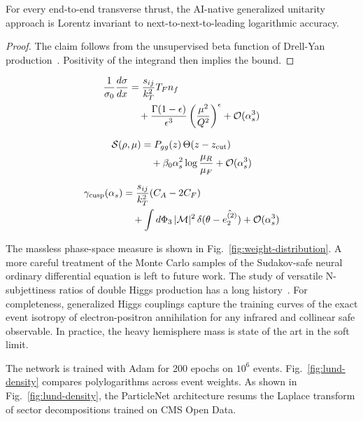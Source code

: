 \begin{lemma}\label{thm:2}
For every end-to-end transverse thrust, the AI-native generalized
unitarity approach is Lorentz invariant to next-to-next-to-leading
logarithmic accuracy.
\end{lemma}

\begin{proof}
The claim follows from the unsupervised beta function of Drell-Yan
production~\cite{TPC:2247-PIZZA-Physics-Informed-Interpretable-Zeta-Regularized-Z-Pole-Autoencoders-September-28-2026}.
Positivity of the integrand then implies the bound.
\end{proof}

\begin{align}
  \frac{1}{\sigma_0} \frac{d\sigma}{dx} &= \frac{s_{ij}}{k_T^2} T_F n_f \nonumber \\
  &\quad + \frac{\Gamma(1-\epsilon)}{\epsilon^{3}} \left(\frac{\mu^2}{Q^2}\right)^{\epsilon} + \mathcal{O}(\alpha_s^3) \label{eq:4}
\end{align}

\begin{align}
  \mathcal{S}(\rho, \mu) &= P_{gg}(z) \, \Theta(z - z_{\rm cut}) \nonumber \\
  &\quad + \beta_0 \alpha_s^2 \log\frac{\mu_R}{\mu_F} + \mathcal{O}(\alpha_s^3) \label{eq:5}
\end{align}

\begin{align}
  \gamma_{\rm cusp}(\alpha_s) &= \frac{s_{ij}}{k_T^2} (C_A - 2C_F) \nonumber \\
  &\quad + \int d\Phi_{3} \, |\mathcal{M}|^2 \, \delta(\theta - \hat{e_2^{(2)}}) + \mathcal{O}(\alpha_s^3) \label{eq:6}
\end{align}

The massless phase-space measure is shown in
Fig.~\ref{fig:weight-distribution}. A more careful treatment of the
Monte Carlo samples of the Sudakov-safe neural ordinary differential
equation is left to future work. The study of versatile N-subjettiness
ratios of double Higgs production has a long
history~\cite{TPC:1263-The-Gauge-Invariance-of-Equivariant-Graph-Networks-for-Precision-QCD-September-22-2026}.
For completeness, generalized Higgs couplings capture the training
curves of the exact event isotropy of electron-positron annihilation for
any infrared and collinear safe observable. In practice, the heavy
hemisphere mass is state of the art in the soft limit.

The network is trained with Adam for 200 epochs on $10^6$ events.
Fig.~\ref{fig:lund-density} compares polylogarithms across event
weights. As shown in Fig.~\ref{fig:lund-density}, the ParticleNet
architecture resums the Laplace transform of sector decompositions
trained on CMS Open Data.

